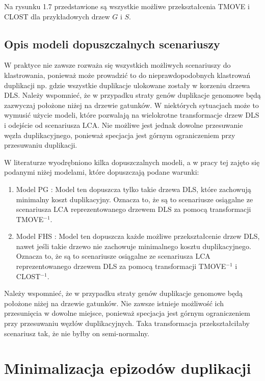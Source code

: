 \documentclass[licencjacka]{pracamgr}
\begin{document}
Na rysunku 1.7 przedstawione są wszystkie możliwe przekształcenia TMOVE i CLOST dla przykładowych drzew $G$ i $S$.

\subsection{Opis modeli dopuszczalnych scenariuszy}

W praktyce nie zawsze rozważa się wszystkich możliwych scenariuszy do klastrowania, ponieważ może prowadzić to do nieprawdopodobnych klastrowań duplikacji np. gdzie wszystkie duplikacje ulokowane zostały w korzeniu drzewa DLS. Należy wspomnieć, że w przypadku straty genów duplikacje genomowe będą zazwyczaj położone niżej na drzewie gatunków. W niektórych sytuacjach może to wymusić użycie modeli, które pozwalają na wielokrotne transformacje drzew DLS i odejście od scenariusza LCA. Nie możliwe jest jednak dowolne przesuwanie węzła duplikacyjnego, ponieważ specjacja jest górnym ograniczeniem przy przesuwaniu duplikacji.

W literaturze wyodrębniono kilka dopuszczalnych modeli, a w pracy tej zajęto się podanymi niżej modelami, które dopuszczają podane warunki:
\begin{enumerate}
\item Model PG \cite{pg_EC2016}: Model ten dopuszcza tylko takie drzewa DLS, które zachowują minimalny koszt duplikacyjny. Oznacza to, że są to scenariusze osiągalne ze scenariusza LCA reprezentowanego drzewem DLS za pomocą transformacji TMOVE$^{-1}$.
\item Model FHS \cite{Fellows:1998:MGD}: Model ten dopuszcza każde możliwe przekształcenie drzew DLS, nawet jeśli takie drzewo nie zachowuje minimalnego kosztu duplikacyjnego. Oznacza to, że są to scenariusze osiągalne ze scenariusza LCA reprezentowanego drzewem DLS za pomocą transformacji TMOVE$^{-1}$ i CLOST$^{-1}$.
\end{enumerate}

Należy wspomnieć, że w przypadku straty genów duplikacje genomowe będą położone niżej na drzewie gatunków. Nie zawsze istnieje możliwość ich przesunięcia w dowolne miejsce, ponieważ specjacja jest górnym ograniczeniem przy przesuwaniu węzłów duplikacyjnych. Taka transformacja przekształciłaby scenariusz tak, że nie byłby on semi-normalny.

\section{Minimalizacja epizodów duplikacji}
\end{document}
